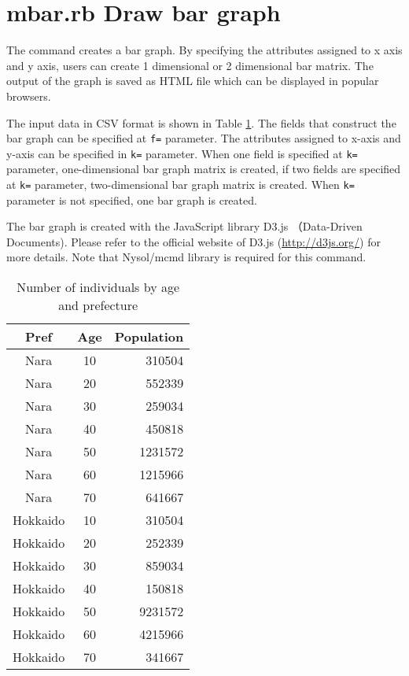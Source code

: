 


\section{mbar.rb Draw bar graph \label{sect:mbar}}

The command creates a bar graph. 
By specifying the attributes assigned to x axis and y axis,  users can create 1 dimensional or 2 dimensional bar matrix. 
The output of the graph is saved as HTML file which can be displayed in popular browsers. 

The input data in CSV format is shown in Table \ref{tbl:mbar_input2}. The fields that construct the bar graph can be specified at \verb|f=| parameter. 
The attributes assigned to x-axis and y-axis can be specified in \verb|k=| parameter. 
When one field is specified at \verb|k=| parameter, one-dimensional bar graph matrix is created, 
if two fields are specified at \verb|k=| parameter, two-dimensional bar graph matrix is created. 
When \verb|k=| parameter is not specified, one bar graph is created. 
 
The bar graph is created with the JavaScript library D3.js （Data-Driven Documents). Please refer to the official website of D3.js  (\url{http://d3js.org/}) for more details.   
 Note that Nysol/mcmd library is required for this command. 
 

\begin{table}[http]
\begin{center}
\caption{Number of individuals by age  and prefecture\label{tbl:mbar_input2}}
{\small
\begin{tabular}[t]{ccr}
\hline
Pref&Age&Population \\
\hline
Nara&10&310504\\
Nara&20&552339\\
Nara&30&259034\\
Nara&40&450818\\
Nara&50&1231572\\
Nara&60&1215966\\
Nara&70&641667\\
Hokkaido&10&310504\\
Hokkaido&20&252339\\
Hokkaido&30&859034\\
Hokkaido&40&150818\\
Hokkaido&50&9231572\\
Hokkaido&60&4215966\\
Hokkaido&70&341667\\
\hline
\end{tabular}
}
\end{center}
\end{table}


